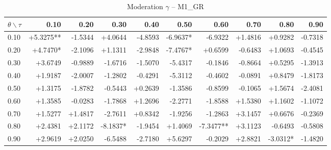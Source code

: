 \begin{table}[!htbp]
  \centering
  \caption{Moderation $\gamma$ -- M1_GR}
  \label{tab:mqqr_gamma_M1_GR}
  \begin{tabular}{lrrrrrrrrr}
    \toprule
    $\theta \backslash \tau$ & 0.10 & 0.20 & 0.30 & 0.40 & 0.50 & 0.60 & 0.70 & 0.80 & 0.90 \\
    \midrule
    0.10 & +5.3275** & -1.5344 & +4.0644 & -4.8593 & -6.9637* & -6.9322 & +1.4816 & +0.9282 & -0.7318 \\
    0.20 & +4.7470* & -2.1096 & +1.1311 & -2.9848 & -7.4767* & +0.6599 & -0.6483 & +1.0693 & -0.4545 \\
    0.30 & +3.6749 & -0.9889 & -1.6716 & -1.5070 & -5.4317 & -0.1846 & -0.8664 & +0.5295 & -1.3913 \\
    0.40 & +1.9187 & -2.0007 & -1.2802 & -0.4291 & -5.3112 & -0.4602 & -0.0891 & +0.8479 & -1.8173 \\
    0.50 & +1.3175 & -1.8782 & -0.5443 & +0.2639 & -1.3586 & -0.8599 & -0.1065 & +1.5674 & -2.4081 \\
    0.60 & +1.3585 & -0.0283 & -1.7868 & +1.2696 & -2.2771 & -1.8588 & +1.5380 & +1.1602 & -1.1072 \\
    0.70 & +1.5277 & +1.4817 & -2.7611 & +0.8342 & -1.9256 & -1.2863 & +3.1457 & +0.6676 & -0.2369 \\
    0.80 & +2.4381 & +2.1172 & -8.1837* & -1.9454 & +1.4069 & -7.3477** & +3.1123 & -0.6493 & -0.5808 \\
    0.90 & +2.9619 & +2.0250 & -6.5488 & -2.7180 & +5.6297 & -0.2029 & +2.8821 & -3.0312* & -1.4820 \\
    \bottomrule
  \end{tabular}
\end{table}
